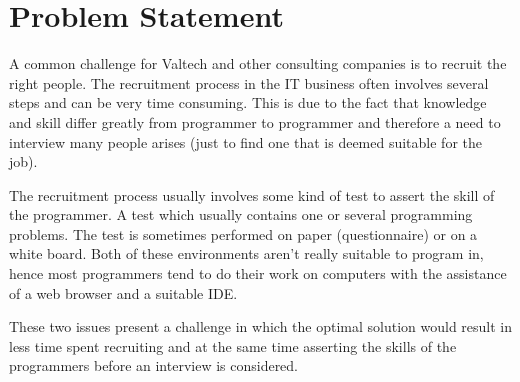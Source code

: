 \section{Problem Statement}
A common challenge for Valtech and other consulting companies is to recruit the right people.  The recruitment process in the IT business often involves several steps and can be very time consuming. This is due to the fact that knowledge and skill differ greatly from programmer to programmer and therefore a need to interview many people arises (just to find one that is deemed suitable for the job). 

The recruitment process usually involves some kind of test to assert the skill of the programmer. A test which usually contains one or several programming problems. The test is sometimes performed on paper (questionnaire) or on a white board. Both of these environments aren't really suitable to program in, hence most programmers tend to do their work on computers with the assistance of a web browser and a suitable IDE. 

These two issues present a challenge in which the optimal solution would result in less time spent recruiting and at the same time asserting the skills of the programmers before an interview is considered.